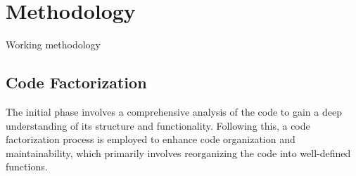\documentclass[10pt,journal,compsoc]{IEEEtran}
\begin{document}
%



\section{Methodology}
Working methodology

\subsection{Code Factorization}
The initial phase involves a comprehensive analysis of the code to gain a deep understanding of its structure and functionality. Following this, a code factorization process is employed to enhance code organization and maintainability, which primarily involves reorganizing the code into well-defined functions.
\end{document}

